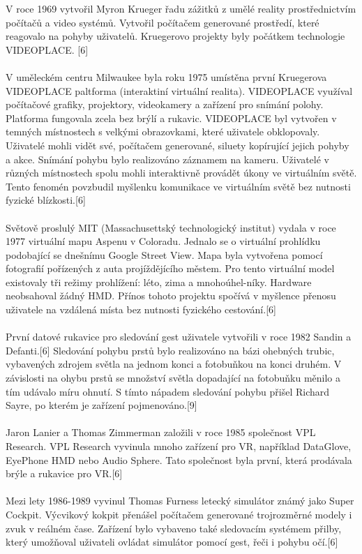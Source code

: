 \documentclass[a4paper, 12pt]{report}
\begin{document}
V roce 1969 vytvořil Myron Krueger řadu zážitků z umělé reality prostřednictvím počítačů a video systémů. Vytvořil počítačem generované prostředí, které reagovalo na pohyby uživatelů. Kruegerovo projekty byly počátkem technologie VIDEOPLACE. [6]\\
\\
V uměleckém centru Milwaukee byla roku 1975 umístěna první Kruegerova VIDEOPLACE paltforma (interaktiní virtuální realita). VIDEOPLACE využíval počítačové grafiky, projektory, videokamery a zařízení pro snímání polohy. Platforma fungovala zcela bez brýlí a rukavic. VIDEOPLACE byl vytvořen v temných místnostech s velkými obrazovkami, které uživatele obklopovaly. Uživatelé mohli vidět své, počítačem generované, siluety kopírující jejich pohyby a akce. Snímání pohybu bylo realizováno záznamem na kameru. Uživatelé v různých místnostech spolu mohli interaktivně provádět úkony ve virtuálním světě. Tento fenomén povzbudil myšlenku komunikace ve virtuálním světě bez nutnosti fyzické blízkosti.[6]\\
\\
Světově proslulý MIT (Massachusettský technologický institut) vydala v roce 1977 virtuální mapu Aspenu v Coloradu. Jednalo se o virtuální prohlídku podobající se dnešnímu Google Street View. Mapa byla vytvořena pomocí fotografií pořízených z auta projíždějícího městem. Pro tento virtuální model existovaly tři režimy prohlížení: léto, zima a mnohoúhel-níky. Hardware neobsahoval žádný HMD. Přínos tohoto projektu spočívá v myšlence přenosu uživatele na vzdálená místa bez nutnosti fyzického cestování.[6]\\
\\
První datové rukavice pro sledování gest uživatele vytvořili v roce 1982 Sandin a Defanti.[6] Sledování pohybu prstů bylo realizováno na bázi ohebných trubic, vybavených zdrojem světla na jednom konci a fotobuňkou na konci druhém. V závislosti na ohybu prstů se množství světla dopadající na fotobuňku měnilo a tím udávalo míru ohnutí. S tímto nápadem sledování pohybu přišel Richard Sayre, po kterém je zařízení pojmenováno.[9]\\
\\
Jaron Lanier a Thomas Zimmerman založili v roce 1985 společnost VPL Research. VPL Research vyvinula mnoho zařízení pro VR, například DataGlove, EyePhone HMD nebo Audio Sphere. Tato společnost byla první, která prodávala brýle a rukavice pro VR.[6]\\
\\
Mezi lety 1986-1989 vyvinul Thomas Furness letecký simulátor známý jako Super Cockpit. Výcvikový kokpit přenášel počítačem generované trojrozměrné modely i zvuk v reálném čase. Zařízení bylo vybaveno také sledovacím systémem přilby, který umožňoval uživateli ovládat simulátor pomocí gest, řeči i pohybu očí.[6]\\
\end{document}
